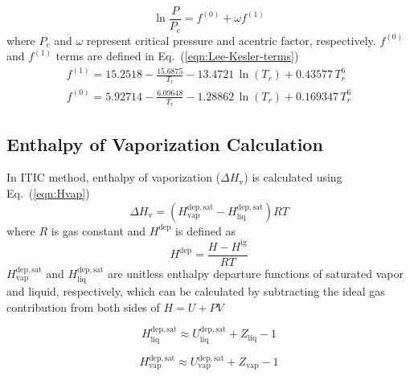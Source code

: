 \documentclass[5p,times]{elsarticle}
\begin{document}
\begin{equation}
{\ln \frac{P}{P_c}=f^{(0)}+\omega f^{(1)}} 
\label{eqn:Lee-Kesler}
\end{equation}
where $P_c$ and $\omega$ represent critical pressure and acentric factor, respectively. $f^{(0)}$ and $f^{(1)}$ terms are defined in Eq.~(\ref{eqn:Lee-Kesler-terms})
\begin{equation}
\begin{array}{l} 
{f^{(1)} = 15.2518 - \frac{15.6875}{T_r} - 13.4721 \, \ln(T_r) +   0.43577 \, T_r^6 } \\ 
{ f^{(0)} = 5.92714 - \frac{6.09648}{T_r} - 1.28862 \, \ln(T_r) + 0.169347 \, T_r^6  } 
\end{array} \label{eqn:Lee-Kesler-terms}
\end{equation}
	
\subsection{Enthalpy of Vaporization Calculation}\label{sec:HvapCalc}
In ITIC method, enthalpy of vaporization ($\Delta H_\mathrm{v}$) is calculated using Eq.~(\ref{eqn:Hvap})
\begin{equation}
\Delta H_\mathrm{v}= ( H^{\mathrm{dep,sat}}_\mathrm{vap} - H^{\mathrm{dep,sat}}_\mathrm{liq})RT
\label{eqn:Hvap}
\end{equation}
where $R$ is gas constant and $H^{\mathrm{dep}}$ is defined as
\begin{equation}
H^{\mathrm{dep}}=\frac{H-H^{\mathrm{ig}}}{RT}
\label{hdep}
\end{equation}
$H^{\mathrm{dep,sat}}_\mathrm{vap}$ and $H^{\mathrm{dep,sat}}_\mathrm{liq}$ are unitless enthalpy departure functions of saturated vapor and liquid, respectively, which can be calculated by subtracting the ideal gas contribution from both sides of $H=U+PV$

\begin{equation}
H^{\mathrm{dep,sat}}_\mathrm{liq} \approx U^{\mathrm{dep, sat}}_\mathrm{liq}+Z_\mathrm{liq} - 1
\label{eqn:HsatLiq}
\end{equation}

\begin{equation}
H^{\mathrm{dep,sat}}_\mathrm{vap} \approx U^{\mathrm{dep, sat}}_\mathrm{vap}+Z_\mathrm{vap} - 1
\label{eqn:HsatVap}
\end{equation}
\end{document}
